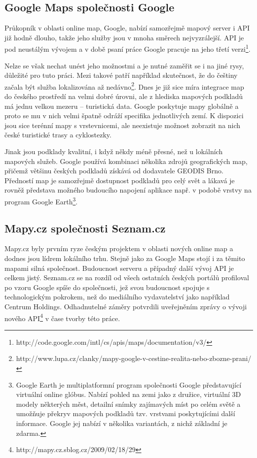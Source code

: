\subsection{Google Maps společnosti Google}
Průkopník v oblasti online map, Google, nabízí samozřejmě mapový
server i API již hodně dlouho, takže jeho služby jsou v mnoha směrech
nejvyzrálejší. API je pod neustálým vývojem a v době psaní práce
Google pracuje na jeho třetí
verzi\footnote{http://code.google.com/intl/cs/apis/maps/documentation/v3/}.

Nelze se však nechat unést jeho možnostmi a je nutné zaměřit se i na
jiné rysy, důležité pro tuto práci. Mezi takové patří
například skutečnost, že do češtiny začala být služba lokalizována až
nedávno\footnote{http://www.lupa.cz/clanky/mapy-google-v-cestine-realita-nebo-zbozne-prani/}.
Dnes je již sice míra integrace map do českého prostředí na velmi
dobré úrovni, ale z hlediska mapových podkladů má jednu velkou mezeru
-- turistická data. Google poskytuje mapy globálně a proto se mu v
nich velmi špatně odráží specifika jednotlivých zemí. K dispozici
jsou sice terénní mapy s vrstevnicemi, ale neexistuje možnost
zobrazit na nich české turistické trasy a cyklostezky.

Jinak jsou podklady kvalitní, i když někdy méně přesné, než u
lokálních mapových služeb. Google používá kombinaci několika zdrojů
geografických map, přičemž většinu českých podkladů získává od
dodavatele GEODIS Brno. Předností map je samozřejmě dostupnost
podkladů pro celý svět a lákavá je rovněž představa možného budoucího 
napojení aplikace např. v podobě vrstvy na program Google
Earth\footnote{Google Earth je multiplatformní program společnosti
Google představující virtuální online glóbus. Nabízí pohled na zemi
jako z družice, virtuální 3D modely některých měst, detailní snímky
zajímavých míst po celém světě a umožňuje překryv mapových podkladů
tzv. vrstvami poskytujícími další informace. Google jej nabízí v
několika variantách, z nichž základní je zdarma.}.

\subsection{Mapy.cz společnosti Seznam.cz}
Mapy.cz byly prvním ryze českým projektem v oblasti nových online map
a dodnes jsou lídrem lokálního trhu. Stejně jako za Google Maps stojí
i za těmito mapami silná společnost. Budoucnost serveru a případný
další vývoj API je celkem jistý. Seznam.cz se na rozdíl od všech
ostatních českých portálů profiloval po vzoru Google spíše do
společnosti, jež svou budoucnost spojuje s technologickým pokrokem,
než do mediálního vydavatelství jako například Centrum Holdings.
Odhadnutelné záměry potvrdili uveřejněním zprávy o vývoji nového
API\footnote{http://mapy.cz.sblog.cz/2009/02/18/29} v čase tvorby
této práce.

